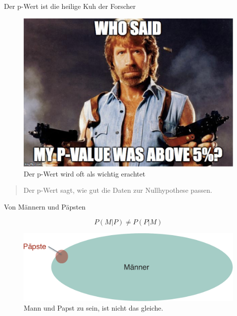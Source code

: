 \begin{frame}{Der p-Wert ist die heilige Kuh der Forscher}

\begin{figure}

{\centering \includegraphics[width=0.35\linewidth]{../images//inferenz/p_value_who_said} 

}

\caption{Der p-Wert wird oft als wichtig erachtet}\label{fig:who-said}
\end{figure}

\begin{quote}
Der p-Wert sagt, wie gut die Daten zur Nullhypothese passen.
\end{quote}

\end{frame}

\begin{frame}{Von Männern und Päpsten}

\[ P(M|P) \ne P(P|M) \]

\begin{figure}

{\centering \includegraphics[width=0.8\linewidth]{../images/inferenz/maenner_papst-crop} 

}

\caption{Mann und Papst zu sein, ist nicht das gleiche.}\label{fig:moslems-terroristen}
\end{figure}

\end{frame}

